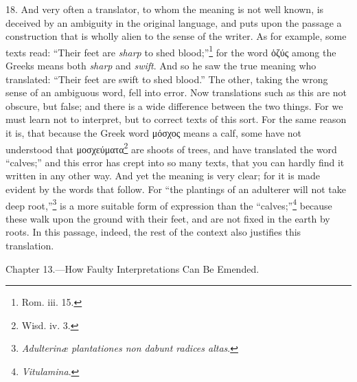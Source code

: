18. And very often a translator, to whom the meaning is not well known, is deceived by an ambiguity in the original language, and puts upon the passage a construction that is wholly alien to the sense of the writer. As for example, some texts read: “Their feet are \emph{sharp} to shed blood;”\footnote{Rom. iii. 15.} for the word \textgreek{ὁζύς} among the Greeks means both \emph{sharp} and \emph{swift}. And so he saw the true meaning who translated: “Their feet are swift to shed blood.” The other, taking the wrong sense of an ambiguous word, fell into error. Now translations such as this are not obscure, but false; and there is a wide difference between the two  things. For we must learn not to interpret, but to correct texts of this sort. For the same reason it is, that because the Greek word \textgreek{μόσχος} means a calf, some have not understood that \textgreek{μοσχεύματα}\footnote{Wisd. iv. 3.} are shoots of trees, and have translated the word “calves;” and this error has crept into so many texts, that you can hardly find it written in any other way. And yet the meaning is very clear; for it is made evident by the words that follow. For “the plantings of an adulterer will not take deep root,”\footnote{\emph{Adulterinæ plantationes non dabunt radices altas}.} is a more suitable form of expression than the “calves;”\footnote{\emph{Vitulamina}.} because these walk upon the ground with their feet, and are not fixed in the earth by roots. In this passage, indeed, the rest of the context also justifies this translation.


Chapter 13.—How Faulty Interpretations Can Be Emended.

